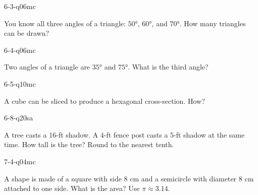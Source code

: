 \begin{practiceQuestion}{6-3-q06}{mc}
\begin{questionText}
You know all three angles of a triangle: $50°$, $60°$, and $70°$. How many triangles can be drawn?
\end{questionText}
\end{practiceQuestion}

\begin{practiceQuestion}{6-4-q06}{mc}
\begin{questionText}
Two angles of a triangle are $35°$ and $75°$. What is the third angle?
\end{questionText}
\end{practiceQuestion}

\begin{practiceQuestion}{6-5-q10}{mc}
\begin{questionText}
A cube can be sliced to produce a hexagonal cross-section. How?
\end{questionText}
\end{practiceQuestion}

\begin{practiceQuestion}{6-8-q20}{sa}
\begin{questionText}
A tree casts a $16$-ft shadow. A $4$-ft fence post casts a $5$-ft shadow at the same time. How tall is the tree? Round to the nearest tenth.
\end{questionText}
\end{practiceQuestion}

\begin{practiceQuestion}{7-4-q04}{mc}
\begin{questionText}
A shape is made of a square with side $8$ cm and a semicircle with diameter $8$ cm attached to one side. What is the area? Use $\pi \approx 3.14$.
\end{questionText}
\end{practiceQuestion}

